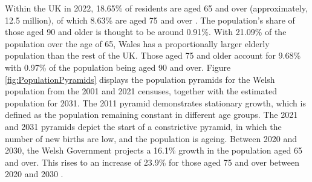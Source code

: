\documentclass[../thesis.tex]{subfiles}
\begin{document}
Within the UK in 2022, 18.65\% of residents are aged 65 and over (approximately, 12.5 million), of which 8.63\% are aged 75 and over \cite{ONS2022b}. The population's share of those aged 90 and older is thought to be around 0.91\%. With 21.09\% of the population over the age of 65, Wales has a proportionally larger elderly population than the rest of the UK. Those aged 75 and older account for 9.68\% with 0.97\% of the population being aged 90 and over. Figure \ref{fig:PopulationPyramids} displays the population pyramids for the Welsh population from the 2001 and 2021 censuses, together with the estimated population for 2031. The 2011 pyramid demonstrates stationary growth, which is defined as the population remaining constant in different age groups. The 2021 and 2031 pyramids depict the start of a constrictive pyramid, in which the number of new births are low, and the population is ageing. Between 2020 and 2030, the Welsh Government projects a 16.1\% growth in the population aged 65 and over. This rises to an increase of 23.9\% for those aged 75 and over between 2020 and 2030 \cite{WelshGovernment2022}.
\end{document}
